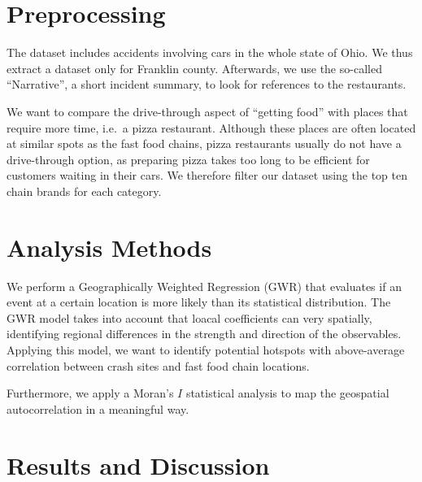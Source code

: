 \documentclass[11pt,a4paper]{article}
\begin{document}
\section{Preprocessing}
The dataset includes accidents involving cars in the whole state of Ohio. We thus extract a dataset only for Franklin county. Afterwards, we use the so-called ``Narrative'', a short incident summary, to look for references to the restaurants.

We want to compare the drive-through aspect of ``getting food'' with places that require more time, i.e.~a pizza restaurant. Although these places are often located at similar spots as the fast food chains, pizza restaurants usually do not have a drive-through option, as preparing pizza takes too long to be efficient for customers waiting in their cars. We therefore filter our dataset using the top ten chain brands for each category.

\section{Analysis Methods}

We perform a Geographically Weighted Regression (GWR) that evaluates if an event at a certain location is more likely than its statistical distribution. The GWR model takes into account that loacal coefficients can very spatially, identifying regional differences in the strength and direction of the observables. Applying this model, we want to identify potential hotspots with above-average correlation between crash sites and fast food chain locations.

Furthermore, we apply a Moran's $I$ statistical analysis to map the geospatial autocorrelation in a meaningful way. 

\section{Results and Discussion}
\end{document}
